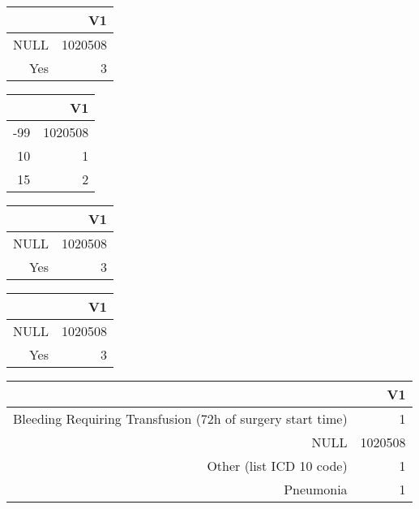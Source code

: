 \bigskip\bigskip
\centering
\begin{tabular}{rr}
  \hline
 & V1 \\ 
  \hline
NULL & 1020508 \\ 
  Yes &   3 \\ 
   \hline
\end{tabular}

\bigskip\bigskip
\centering
\begin{tabular}{rr}
  \hline
 & V1 \\ 
  \hline
-99 & 1020508 \\ 
  10 &   1 \\ 
  15 &   2 \\ 
   \hline
\end{tabular}

\bigskip\bigskip
\centering
\begin{tabular}{rr}
  \hline
 & V1 \\ 
  \hline
NULL & 1020508 \\ 
  Yes &   3 \\ 
   \hline
\end{tabular}

\bigskip\bigskip
\centering
\begin{tabular}{rr}
  \hline
 & V1 \\ 
  \hline
NULL & 1020508 \\ 
  Yes &   3 \\ 
   \hline
\end{tabular}

\bigskip\bigskip
\centering
\begin{tabular}{rr}
  \hline
 & V1 \\ 
  \hline
Bleeding Requiring Transfusion (72h of surgery start time) &   1 \\ 
  NULL & 1020508 \\ 
  Other (list ICD 10 code) &   1 \\ 
  Pneumonia &   1 \\ 
   \hline
\end{tabular}

